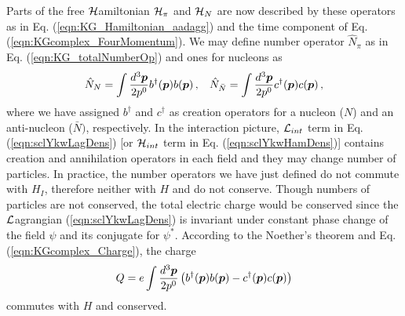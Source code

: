Parts of the free ${\cal H}$amiltonian ${\cal H}_\pi$ and ${\cal H}_N$ are now
described by these operators as in Eq. (\ref{eqn:KG_Hamiltonian_aadagg}) and 
the time component of Eq. (\ref{eqn:KGcomplex_FourMomentum}).
We may define number operator $\hat{N}_\pi$ as in Eq. (\ref{eqn:KG_totalNumberOp})
and ones for nucleons as
\begin{eqnarray}
\hat{N}_N = \int \frac{d^3 \mbox{\boldmath $p$}}{2p^0} b^\dagger(\mbox{\boldmath $p$}) b(\mbox{\boldmath $p$})\,,
\hspace{3mm}
\hat{N}_{\bar{N}} = \int \frac{d^3 \mbox{\boldmath $p$}}{2p^0} c^\dagger(\mbox{\boldmath $p$}) c(\mbox{\boldmath $p$})\,,
\end{eqnarray}
where we have assigned $b^\dagger$ and $c^\dagger$ as creation operators
for a nucleon ($N$) and an anti-nucleon ($\bar{N})$, respectively.
In the interaction picture, ${\cal L}_{int}$ term in Eq.(\ref{eqn:sclYkwLagDens})
[or ${\cal H}_{int}$ term in Eq. (\ref{eqn:sclYkwHamDens})] contains creation and
annihilation operators in each field and they may change number of
particles. In practice, the number operators we have just defined do not commute 
with $H_I$, therefore neither with $H$ and do not conserve.
Though numbers of particles are not conserved, the total electric charge would 
be conserved since the ${\cal L}$agrangian (\ref{eqn:sclYkwLagDens}) is invariant
under constant phase change of the field $\psi$ and its conjugate for $\psi^*$.
According to the Noether's theorem and Eq. (\ref{eqn:KGcomplex_Charge}), 
the charge
\begin{eqnarray}
Q = e \int \frac{d^3 \mbox{\boldmath $p$}}{2p^0}
\left(
b^\dagger({\mbox{\boldmath $p$}}) b({\mbox{\boldmath $p$}}) - c^\dagger({\mbox{\boldmath $p$}}) c({\mbox{\boldmath $p$}})
\right)
\label{eqn:scYelchrg}
\end{eqnarray}
commutes with $H$ and conserved.

